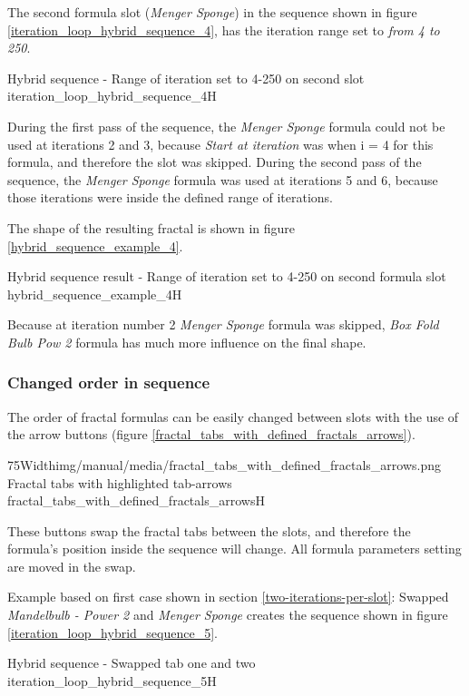 The second formula slot (\emph{Menger Sponge}) in the sequence shown in figure \ref{iteration_loop_hybrid_sequence_4}, has the iteration range set to \emph{from 4 to 250}.


{Hybrid sequence - Range of iteration set to 4-250 on second slot}
{iteration_loop_hybrid_sequence_4}{H}

During the first pass of the sequence, the \emph{Menger Sponge} formula could not be used at iterations 2 and 3,
because \emph{Start at iteration} was when i = 4 for this formula, and therefore the slot was skipped.
During the second pass of the sequence, the \emph{Menger Sponge} formula was used at iterations 5 and 6,
because those iterations were inside the defined range of iterations.

The shape of the resulting fractal is shown in figure \ref{hybrid_sequence_example_4}.

{Hybrid sequence result - Range of iteration set to 4-250 on second formula slot}
{hybrid_sequence_example_4}{H}

Because at iteration number 2 \emph{Menger Sponge} formula was skipped, \emph{Box Fold Bulb Pow 2} formula has much more influence on the final shape.

\subsubsection{Changed order in sequence}

The order of fractal formulas can be easily changed between slots with the use of the arrow buttons (figure \ref{fractal_tabs_with_defined_fractals_arrows}).

\simpleImageWithCaption75Width{img/manual/media/fractal_tabs_with_defined_fractals_arrows.png}
{Fractal tabs with highlighted tab-arrows}
{fractal_tabs_with_defined_fractals_arrows}{H}

These buttons swap the fractal tabs between the slots, and therefore  the formula's position inside the sequence will change. All formula parameters setting are moved in the swap.

Example based on first case shown in section \ref{two-iterations-per-slot}:
Swapped \emph{Mandelbulb - Power 2} and \emph{Menger Sponge} creates the sequence shown in figure \ref{iteration_loop_hybrid_sequence_5}.

{Hybrid sequence - Swapped tab one and two}
{iteration_loop_hybrid_sequence_5}{H}

